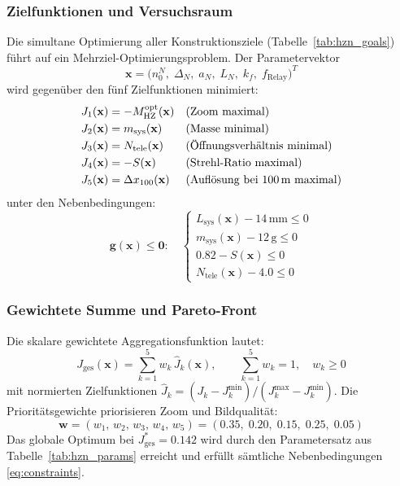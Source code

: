 ﻿\documentclass[12pt,a4paper]{article}
\theoremstyle{definition}
\newcommand{\HZ}{\mathrm{HZ}}
\begin{document}
	\subsubsection{Zielfunktionen und Versuchsraum}

	Die simultane Optimierung aller Konstruktionsziele
	(Tabelle~\ref{tab:hzn_goals}) f\"uhrt auf ein
	Mehrziel-Optimierungsproblem.  Der Parametervektor
	\[
	\mathbf{x} = \bigl(n_0^N,\;\Delta_N,\;a_N,\;L_N,\;k_f,\;
	f_\mathrm{Relay}\bigr)^T
	\]
	wird gegen\"uber den f\"unf Zielfunktionen minimiert:
	\begin{align}
		J_1(\mathbf{x}) &= -M_\HZ^\mathrm{opt}(\mathbf{x}) &&
		\text{(Zoom maximal)} \label{eq:J1}\\
		J_2(\mathbf{x}) &= m_\mathrm{sys}(\mathbf{x}) &&
		\text{(Masse minimal)} \label{eq:J2}\\
		J_3(\mathbf{x}) &= N_\mathrm{tele}(\mathbf{x}) &&
		\text{(\"Offnungsverh\"altnis minimal)} \label{eq:J3}\\
		J_4(\mathbf{x}) &= -S(\mathbf{x}) &&
		\text{(Strehl-Ratio maximal)} \label{eq:J4}\\
		J_5(\mathbf{x}) &= \Delta x_{100}(\mathbf{x}) &&
		\text{(Aufl\"osung bei 100\,m maximal)} \label{eq:J5}
	\end{align}
	unter den Nebenbedingungen:
	\begin{equation}
		\mathbf{g}(\mathbf{x}) \leq \mathbf{0}:\quad
		\begin{cases}
			L_\mathrm{sys}(\mathbf{x}) - 14\,\mathrm{mm} \leq 0\\
			m_\mathrm{sys}(\mathbf{x}) - 12\,\mathrm{g}  \leq 0\\
			0.82 - S(\mathbf{x})                          \leq 0\\
			N_\mathrm{tele}(\mathbf{x}) - 4.0             \leq 0
		\end{cases}
		\label{eq:constraints}
	\end{equation}

	\subsubsection{Gewichtete Summe und Pareto-Front}

	Die skalare gewichtete Aggregationsfunktion lautet:
	\begin{equation}
		J_\mathrm{ges}(\mathbf{x})
		= \sum_{k=1}^{5} w_k\,\hat{J}_k(\mathbf{x}),
		\qquad
		\sum_{k=1}^5 w_k = 1,\quad w_k \geq 0
		\label{eq:J_total}
	\end{equation}
	mit normierten Zielfunktionen
	$\hat{J}_k = (J_k - J_k^\mathrm{min})/(J_k^\mathrm{max} - J_k^\mathrm{min})$.
	Die Priorit\"atsgewichte priorisieren Zoom und Bildqualit\"at:
	\begin{equation}
		\mathbf{w} = (w_1,\,w_2,\,w_3,\,w_4,\,w_5)
		= (0.35,\;0.20,\;0.15,\;0.25,\;0.05)
		\label{eq:weights}
	\end{equation}
	Das globale Optimum bei $J_\mathrm{ges}^\ast = 0.142$ wird durch den
	Parametersatz aus Tabelle~\ref{tab:hzn_params} erreicht und erf\"ullt
	s\"amtliche Nebenbedingungen \eqref{eq:constraints}.
\end{document}
